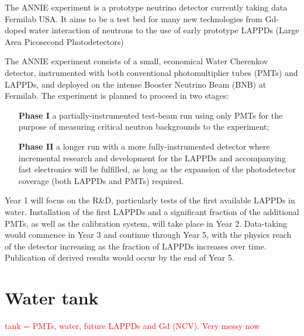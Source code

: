 The ANNIE experiment is a prototype neutrino detector %
currently taking data Fermilab USA.
It aims to be a test bed %
for many new technologies from Gd-doped water %
interaction of neutrons to the use of early prototype %
LAPPDs (Large Area Picosecond Photodetectors) %

The ANNIE experiment consists of a small, economical Water Cherenkov detector, instrumented %
with both conventional photomultiplier tubes (PMTs) and LAPPDs, and deployed on the intense %
Booster Neutrino Beam (BNB) at Fermilab.
The experiment is planned to proceed in two stages: 
\begin{itemize}
  \item[\bfseries Phase I] a partially-instrumented test-beam run using only PMTs %
    for the purpose of measuring critical neutron backgrounds to the experiment;
  \item[\bfseries Phase II] a longer run with a more fully-instrumented detector %
    where incremental research and development for the LAPPDs and %
    accompanying fast electronics will be fulfilled, as long as the expansion of the %
    photodetector coverage (both LAPPDs and PMTs) required.
\end{itemize}

Year 1 will focus on the R\&D, particularly tests of the first available LAPPDs in water.
Installation of the first LAPPDs and a significant fraction of the additional PMTs, as %
well as the calibration system, will take place in Year 2.
Data-taking would commence in Year 3 and continue through Year 5, with the physics reach of %
the detector increasing as the fraction of LAPPDs increases over time.
Publication of derived results would occur by the end of Year 5.


\section{Water tank}
\label{2.2}
\textcolor{red}{tank = PMTs, water, future LAPPDs and Gd (NCV). Very messy now}

